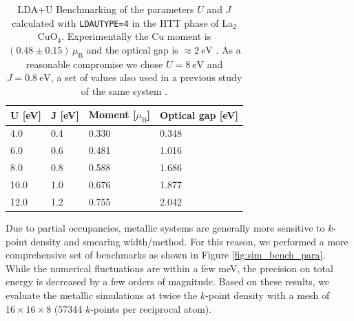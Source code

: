 \begin{table}[b]
	\centering
	\caption[LDA+U Benchmarking]{LDA+U Benchmarking of the parameters $U$ and $J$ calculated with \texttt{LDAUTYPE=4} in the HTT phase of La$_2$CuO$_4$. Experimentally the Cu moment is $(0.48 \pm 0.15) \, \mu_\text{B}$ \cite{Vaknin1987} and the optical gap is $\approx \SI{2}{\eV}$ \cite{Uchida1991}. As a reasonable compromise we chose $U=\SI{8}{\eV}$ and $J=\SI{0.8}{\eV}$, a set of values also used in a previous study of the same system \cite{Anisimov2004}.}
	\label{tab:ldau}
	\begin{tabular}{@{}llll@{}}
		\toprule
		U [eV] & J [eV] & Moment [$\mu_\text{B}$] & Optical gap [eV] \\ \midrule
		4.0    & 0.4    & 0.330       & 0.348    \\
		6.0    & 0.6    & 0.481       & 1.016    \\
		8.0    & 0.8    & 0.588       & 1.686    \\
		10.0   & 1.0    & 0.676       & 1.877    \\
		12.0   & 1.2    & 0.755       & 2.042    \\ \bottomrule
	\end{tabular}
\end{table}

Due to partial occupancies, metallic systems are generally more sensitive to $k$-point density and smearing width/method. For this reason, we performed a more comprehensive set of benchmarks as shown in Figure \ref{fig:sim_bench_para}. While the numerical fluctuations are within a few meV, the precision on total energy is decreased by a few orders of magnitude. Based on these results, we evaluate the metallic simulations at twice the $k$-point density with a mesh of $16 \times 16 \times 8$ (57344 $k$-points per reciprocal atom).

